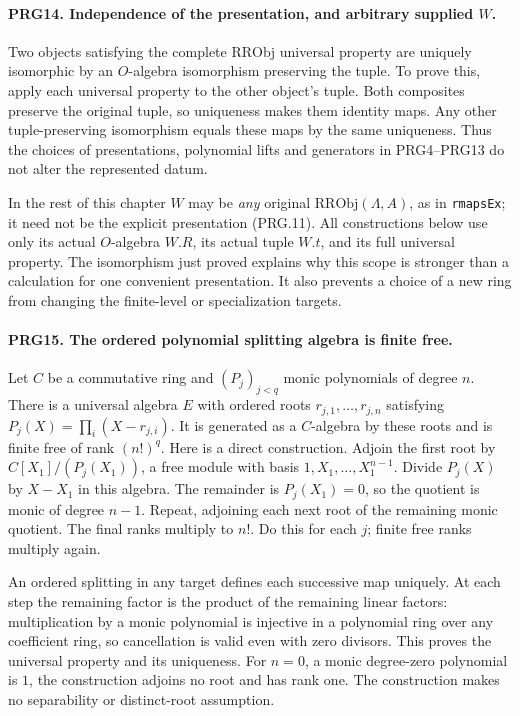 \paragraph{PRG14. Independence of the presentation, and arbitrary supplied \(W\).}
\label{claim:PRG14}
Two objects satisfying the complete \(\mathrm{RRObj}\) universal
property are uniquely isomorphic by an \(O\)-algebra isomorphism
preserving the tuple. To prove this, apply each universal property
to the other object's tuple. Both composites preserve the original
tuple, so uniqueness makes them identity maps. Any other
tuple-preserving isomorphism equals these maps by the same
uniqueness. Thus the choices of presentations, polynomial lifts
and generators in PRG4--PRG13 do not alter the represented datum.

In the rest of this chapter \(W\) may be \emph{any} original
\(\mathrm{RRObj}(\Lambda,A)\), as in \texttt{rmapsEx}; it need
not be the explicit presentation (PRG.11). All constructions below
use only its actual \(O\)-algebra \(W.R\), its actual tuple
\(W.t\), and its full universal property. The isomorphism just
proved explains why this scope is stronger than a calculation for
one convenient presentation. It also prevents a choice of a new
ring from changing the finite-level or specialization targets.

\paragraph{PRG15. The ordered polynomial splitting algebra is finite free.}
\label{claim:PRG15}
Let \(C\) be a commutative ring and \((P_j)_{j<q}\) monic
polynomials of degree \(n\). There is a universal algebra \(E\)
with ordered roots \(r_{j,1},\ldots,r_{j,n}\) satisfying
\(P_j(X)=\prod_i(X-r_{j,i})\). It is generated as a
\(C\)-algebra by these roots and is finite free of rank
\((n!)^q\). Here is a direct construction. Adjoin the first root
by \(C[X_1]/(P_j(X_1))\), a free module with basis
\(1,X_1,\ldots,X_1^{n-1}\). Divide \(P_j(X)\) by
\(X-X_1\) in this algebra. The remainder is \(P_j(X_1)=0\),
so the quotient is monic of degree \(n-1\). Repeat, adjoining
each next root of the remaining monic quotient. The final ranks
multiply to \(n!\). Do this for each \(j\); finite free ranks
multiply again.

An ordered splitting in any target defines each successive map
uniquely. At each step the remaining factor is the product of the
remaining linear factors: multiplication by a monic polynomial
is injective in a polynomial ring over any coefficient ring, so
cancellation is valid even with zero divisors. This proves the
universal property and its uniqueness. For \(n=0\), a monic
degree-zero polynomial is \(1\), the construction adjoins no
root and has rank one. The construction makes no separability or
distinct-root assumption.

